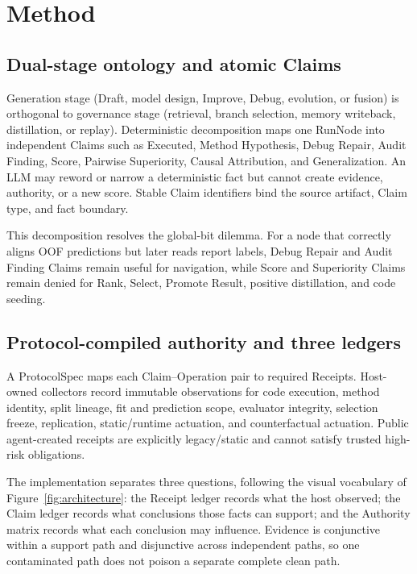 \documentclass{article}
\begin{document}
\section{Method}

\subsection{Dual-stage ontology and atomic Claims}

Generation stage (Draft, model design, Improve, Debug, evolution, or fusion) is
orthogonal to governance stage (retrieval, branch selection, memory writeback,
distillation, or replay).  Deterministic decomposition maps one RunNode into
independent Claims such as Executed, Method Hypothesis, Debug Repair, Audit
Finding, Score, Pairwise Superiority, Causal Attribution, and Generalization.
An LLM may reword or narrow a deterministic fact but cannot create evidence,
authority, or a new score.  Stable Claim identifiers bind the source artifact,
Claim type, and fact boundary.

This decomposition resolves the global-bit dilemma.  For a node that correctly
aligns OOF predictions but later reads report labels, Debug Repair and Audit
Finding Claims remain useful for navigation, while Score and Superiority Claims
remain denied for Rank, Select, Promote Result, positive distillation, and code
seeding.

\subsection{Protocol-compiled authority and three ledgers}

A ProtocolSpec maps each Claim--Operation pair to required Receipts.  Host-owned
collectors record immutable observations for code execution, method identity,
split lineage, fit and prediction scope, evaluator integrity, selection freeze,
replication, static/runtime actuation, and counterfactual actuation.  Public
agent-created receipts are explicitly legacy/static and cannot satisfy trusted
high-risk obligations.

The implementation separates three questions, following the visual vocabulary
of Figure~\ref{fig:architecture}: the Receipt ledger records what the host
observed; the Claim ledger records what conclusions those facts can support;
and the Authority matrix records what each conclusion may influence.  Evidence
is conjunctive within a support path and disjunctive across independent paths,
so one contaminated path does not poison a separate complete clean path.
\end{document}
